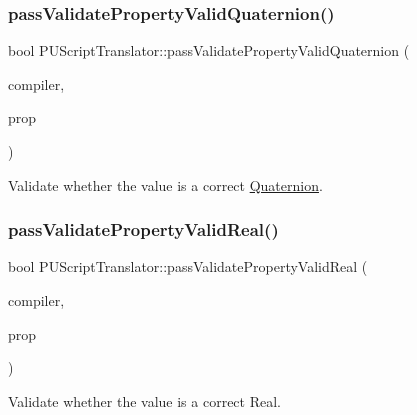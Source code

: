 \subsubsection{\texorpdfstring{pass\+Validate\+Property\+Valid\+Quaternion()}{passValidatePropertyValidQuaternion()}\hspace{0.1cm}{\footnotesize\ttfamily [2/2]}}
{\footnotesize\ttfamily bool P\+U\+Script\+Translator\+::pass\+Validate\+Property\+Valid\+Quaternion (\begin{DoxyParamCaption}\item[{\hyperlink{classPUScriptCompiler}{P\+U\+Script\+Compiler} $\ast$}]{compiler,  }\item[{\hyperlink{classPUPropertyAbstractNode}{P\+U\+Property\+Abstract\+Node} $\ast$}]{prop }\end{DoxyParamCaption})}

Validate whether the value is a correct \hyperlink{classQuaternion}{Quaternion}. \mbox{\label{classPUScriptTranslator_a58b9dca1f92b31f3f881bacce1cab684}} 
\subsubsection{\texorpdfstring{pass\+Validate\+Property\+Valid\+Real()}{passValidatePropertyValidReal()}\hspace{0.1cm}{\footnotesize\ttfamily [1/2]}}
{\footnotesize\ttfamily bool P\+U\+Script\+Translator\+::pass\+Validate\+Property\+Valid\+Real (\begin{DoxyParamCaption}\item[{\hyperlink{classPUScriptCompiler}{P\+U\+Script\+Compiler} $\ast$}]{compiler,  }\item[{\hyperlink{classPUPropertyAbstractNode}{P\+U\+Property\+Abstract\+Node} $\ast$}]{prop }\end{DoxyParamCaption})}

Validate whether the value is a correct Real. \mbox{\label{classPUScriptTranslator_a58b9dca1f92b31f3f881bacce1cab684}} 

